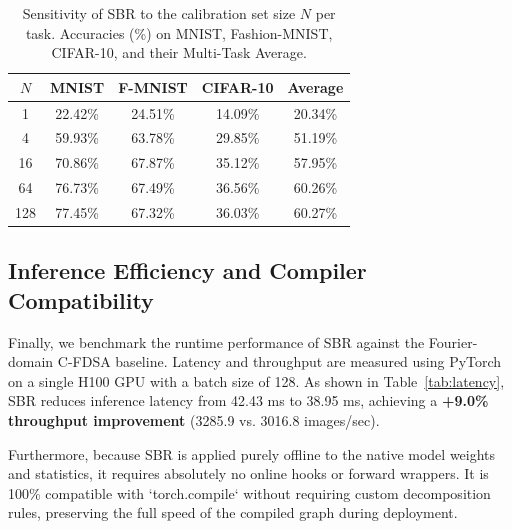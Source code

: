 \documentclass{article}
\theoremstyle{plain}
\theoremstyle{definition}
\theoremstyle{remark}
\begin{document}
\begin{table}[t]
\caption{Sensitivity of SBR to the calibration set size $N$ per task. Accuracies (\%) on MNIST, Fashion-MNIST, CIFAR-10, and their Multi-Task Average.}
\label{tab:sensitivity}
\vskip 0.1in
\begin{center}
\begin{footnotesize}
\begin{sc}
\setlength{\tabcolsep}{4.5pt}
\begin{tabular}{ccccc}
\toprule
$N$ & MNIST & F-MNIST & CIFAR-10 & Average \\
\midrule
1 & 22.42\% & 24.51\% & 14.09\% & 20.34\% \\
4 & 59.93\% & 63.78\% & 29.85\% & 51.19\% \\
16 & 70.86\% & 67.87\% & 35.12\% & 57.95\% \\
64 & 76.73\% & 67.49\% & 36.56\% & 60.26\% \\
128 & 77.45\% & 67.32\% & 36.03\% & 60.27\% \\
\bottomrule
\end{tabular}
\end{sc}
\end{footnotesize}
\end{center}
\end{table}

\subsection{Inference Efficiency and Compiler Compatibility}
Finally, we benchmark the runtime performance of SBR against the Fourier-domain C-FDSA baseline. Latency and throughput are measured using PyTorch on a single H100 GPU with a batch size of 128. As shown in Table~\ref{tab:latency}, SBR reduces inference latency from 42.43 ms to 38.95 ms, achieving a \textbf{+9.0\% throughput improvement} (3285.9 vs. 3016.8 images/sec). 

Furthermore, because SBR is applied purely offline to the native model weights and statistics, it requires absolutely no online hooks or forward wrappers. It is 100\% compatible with `torch.compile` without requiring custom decomposition rules, preserving the full speed of the compiled graph during deployment.
\end{document}
